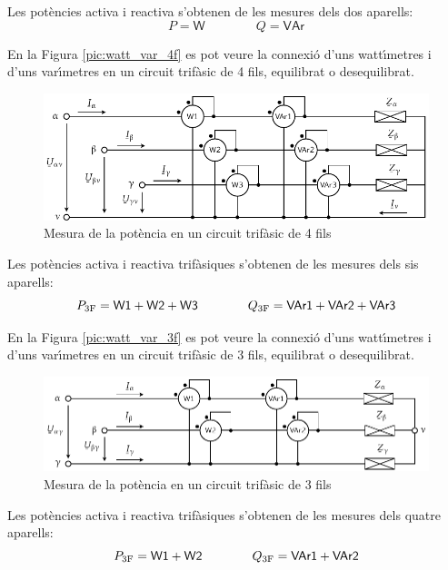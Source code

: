 Les pot\`{e}ncies activa i reactiva s'obtenen de les mesures dels dos
aparells:
\begin{equation}
    P = \textsf{W} \qquad\qquad Q = \textsf{VAr}
\end{equation}

En la Figura \vref{pic:watt_var_4f} es pot veure la connexi\'{o} d'uns
watt\'{\i}metres i d'uns var\'{\i}metres en un circuit trif\`{a}sic de 4 fils,
equilibrat o desequilibrat.
\begin{figure}[htb]
\centering
    \includegraphics{Imatges/Cap-Fonaments-Mesura-Potencia-Trif-4f.pdf}
\caption{Mesura de la pot\`{e}ncia en un circuit  trif\`{a}sic de 4 fils}
\label{pic:watt_var_4f}
\end{figure}

Les pot\`{e}ncies activa i reactiva trif\`{a}siques s'obtenen de les mesures
dels sis aparells:
\begin{equation}
    P_\mathrm{3F} = \textsf{W1} +  \textsf{W2} + \textsf{W3}
    \qquad\qquad Q_\mathrm{3F} = \textsf{VAr1} +  \textsf{VAr2} + \textsf{VAr3}
\end{equation}

En la Figura \vref{pic:watt_var_3f} es pot veure la connexi\'{o} d'uns
watt\'{\i}metres i d'uns var\'{\i}metres en un circuit trif\`{a}sic de 3 fils,
equilibrat o desequilibrat.
\begin{figure}[htb]
\centering
    \includegraphics{Imatges/Cap-Fonaments-Mesura-Potencia-Trif-3f.pdf}
\caption{Mesura de la pot\`{e}ncia en un circuit  trif\`{a}sic de 3 fils}
\label{pic:watt_var_3f}
\end{figure}

Les pot\`{e}ncies activa i reactiva trif\`{a}siques s'obtenen de les mesures
dels quatre aparells:
\begin{equation}
    P_\mathrm{3F} = \textsf{W1} +  \textsf{W2}
    \qquad\qquad Q_\mathrm{3F} = \textsf{VAr1} +  \textsf{VAr2}
\end{equation}

